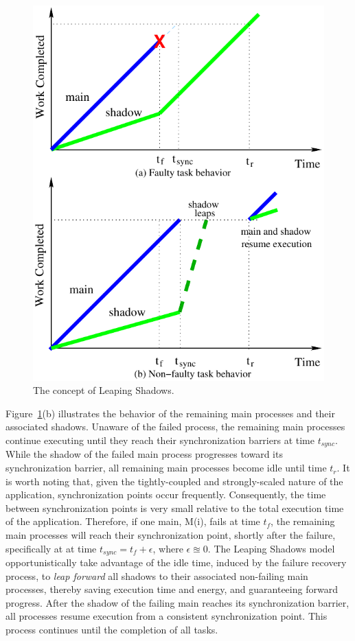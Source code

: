\begin{figure}[!t]
	\begin{center}
			\includegraphics[width=0.8\columnwidth]{Figures/jump.pdf}
	\end{center}
	\caption{The concept of Leaping Shadows.}
	\label{fig:leap}
\end{figure}

Figure~\ref{fig:leap}(b) illustrates the behavior of the remaining main processes and their associated shadows. Unaware of the failed process, the remaining main processes continue executing until they reach their synchronization barriers at time $t_{sync}$. While the shadow of the failed main process progresses toward its synchronization barrier, all remaining main processes become idle until time $t_r$. It is worth noting that, given the tightly-coupled and strongly-scaled nature of the application,  synchronization points occur frequently. Consequently, the time between synchronization points is very small relative to the total execution time of the application. Therefore, if one main, M(i), fails at 
time $t_f$, the remaining main processes will reach their synchronization point, shortly after the failure, specifically at at time $t_{sync} = t_f +\epsilon$, 
where $\epsilon \approxeq 0$. The Leaping Shadows model opportunistically take advantage of the idle time, induced by the failure recovery process, to {\it leap forward} all shadows to their associated non-failing main processes, thereby saving execution time and energy, and guaranteeing forward progress. 
After the shadow of the failing main reaches its synchronization barrier, all processes resume execution from a consistent synchronization point. This process continues until the completion of all tasks. 

